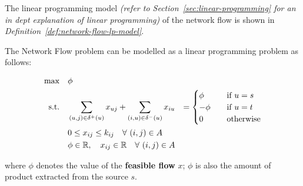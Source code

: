 \documentclass[english]{article}
\begin{document}
The linear programming model \textit{(refer to Section~\ref{sec:linear-programming} for an in dept explanation of linear programming)} of the network flow is shown in \textit{Definition~\ref{def:network-flow-lp-model}}.

\begin{definition}
  \label{def:network-flow-lp-model}

  The Network Flow problem can be modelled as a linear programming problem as follows:

  \begin{gather*}
    \begin{aligned}
      \max \quad        & \phi                                                                                                                                                                                       \\
      \text{s.t.} \quad & \displaystyle \sum_{\left( u, j \right) \in \delta^+(u)} x_{uj} + \displaystyle \sum_{\left( i, u \right) \in \delta^-(u)} x_{iu} & = \begin{cases}
                                                                                                                                                                  \phi \quad   & \text{if } u = s \\
                                                                                                                                                                  - \phi \quad & \text{if } u = t \\
                                                                                                                                                                  0 \quad      & \text{otherwise}
                                                                                                                                                                \end{cases} \\
                        & 0 \leq x_{ij} \leq k_{ij} \quad \forall \, \left( i, j \right) \in A                                                                                                                       \\
                        & \phi \in \mathbb{R}, \quad x_{ij} \in \mathbb{R} \quad \forall \, \left( i, j \right) \in A
    \end{aligned}
  \end{gather*}

  where \(\phi\) denotes the value of the \textbf{feasible flow} \(x\);
  \(\phi\) is also the amount of product extracted from the source \(s\).
\end{definition}
\end{document}
